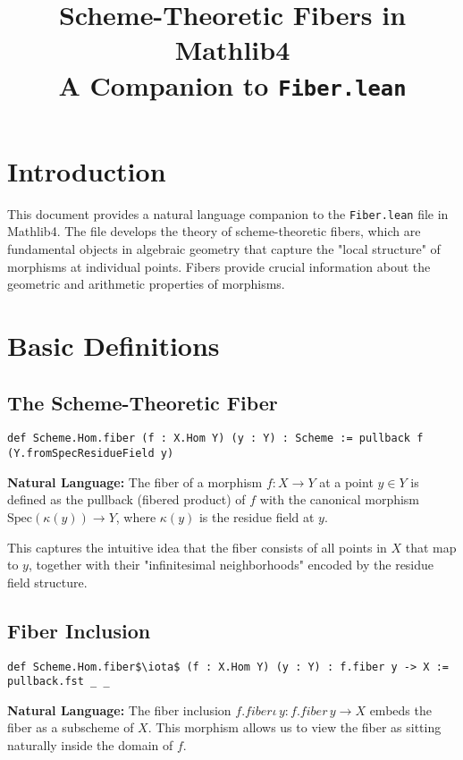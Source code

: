 \documentclass{article}
\title{Scheme-Theoretic Fibers in Mathlib4\\
\large A Companion to \texttt{Fiber.lean}}
\author{}
\date{}
\theoremstyle{definition}
\begin{document}
\maketitle

\section{Introduction}

This document provides a natural language companion to the \texttt{Fiber.lean} file in Mathlib4. The file develops the theory of scheme-theoretic fibers, which are fundamental objects in algebraic geometry that capture the "local structure" of morphisms at individual points. Fibers provide crucial information about the geometric and arithmetic properties of morphisms.

\section{Basic Definitions}

\subsection{The Scheme-Theoretic Fiber}

\begin{lstlisting}
def Scheme.Hom.fiber (f : X.Hom Y) (y : Y) : Scheme := pullback f (Y.fromSpecResidueField y)
\end{lstlisting}

\textbf{Natural Language:} The fiber of a morphism $f: X \to Y$ at a point $y \in Y$ is defined as the pullback (fibered product) of $f$ with the canonical morphism $\mathrm{Spec}(\kappa(y)) \to Y$, where $\kappa(y)$ is the residue field at $y$.

This captures the intuitive idea that the fiber consists of all points in $X$ that map to $y$, together with their "infinitesimal neighborhoods" encoded by the residue field structure.

\subsection{Fiber Inclusion}

\begin{lstlisting}
def Scheme.Hom.fiber$\iota$ (f : X.Hom Y) (y : Y) : f.fiber y -> X := pullback.fst _ _
\end{lstlisting}

\textbf{Natural Language:} The fiber inclusion $f.fiber\iota\, y: f.fiber\, y \to X$ embeds the fiber as a subscheme of $X$. This morphism allows us to view the fiber as sitting naturally inside the domain of $f$.
\end{document}
